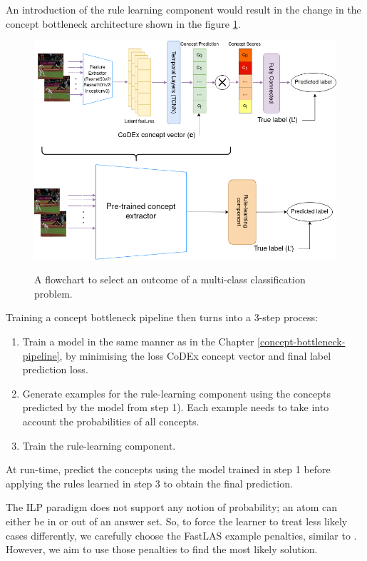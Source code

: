 An introduction of the rule learning component would result in the change in the concept bottleneck architecture shown in the figure \ref{logic-based-concept-bottleneck}.
\begin{figure}[h]
\caption{A flowchart to select an outcome of a multi-class classification problem.}
\vspace{10pt}
\centering
\includegraphics[width=\textwidth]{logic-based-classification/logic-based-classification-architecture.png}
\label{logic-based-concept-bottleneck}
\end{figure}

Training a concept bottleneck pipeline then turns into a 3-step process:
\begin{enumerate}
    \item Train a model in the same manner as in the Chapter \ref{concept-bottleneck-pipeline}, by minimising the loss CoDEx concept vector and final label prediction loss.
    \item Generate examples for the rule-learning component using the concepts predicted by the model from step 1). Each example needs to take into account the probabilities of all concepts.
    \item Train the rule-learning component.
\end{enumerate}

At run-time, predict the concepts using the model trained in step 1 before applying the rules learned in step 3 to obtain the final prediction.

The ILP paradigm does not support any notion of probability; an atom can either be in or out of an answer set. 
So, to force the learner to treat less likely cases differently, we carefully choose the FastLAS example penalties, similar to \cite{RefWorks:RefID:71-cunnington2021ff-nsl:}.
However, we aim to use those penalties to find the most likely solution.


